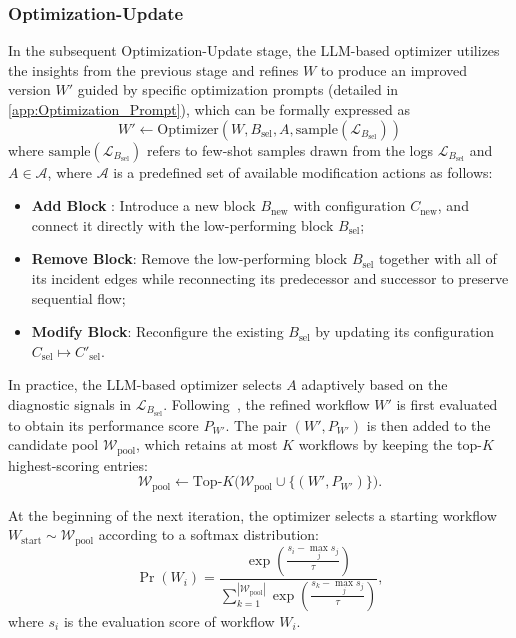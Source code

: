 \documentclass{article}
\theoremstyle{plain}
\theoremstyle{definition}
\theoremstyle{remark}
\begin{document}
\subsubsection{Optimization-Update}
In the subsequent Optimization-Update stage, the LLM-based optimizer utilizes the insights from the previous stage and refines $W$ to produce an improved version $W'$ guided by specific optimization prompts (detailed in \cref{app:Optimization_Prompt}), which can be formally expressed as
\begin{equation} \label{eq:optimization_step}
W' \leftarrow \text{Optimizer}(W, B_{\text{sel}}, A, \text{sample}(\mathcal{L}_{B_{\text{sel}}}))
\end{equation}
where $\text{sample}(\mathcal{L}_{B_{\text{sel}}})$ refers to few-shot samples drawn from the logs $\mathcal{L}_{B_{\text{sel}}}$ and $A\in \mathcal{A}$, where $\mathcal{A}$ is a predefined set of available modification actions as follows:
\begin{itemize}
    \item \textbf{Add Block} : Introduce a new block $B_{\text{new}}$ with configuration $C_{\text{new}}$, and connect it directly with the low-performing block $B_{\text{sel}}$;
    \item \textbf{Remove Block}: Remove the low-performing block $B_{\text{sel}}$ together with all of its incident edges while reconnecting its predecessor and successor to preserve sequential flow;
    \item \textbf{Modify Block}: Reconfigure the existing $B_{\text{sel}}$ by updating its configuration $C_{\text{sel}} \mapsto C'_{\text{sel}}$.
\end{itemize}
In practice, the LLM-based optimizer selects $A$ adaptively based on the diagnostic signals in $\mathcal{L}_{B_{\text{sel}}}$.
Following~\citet{zhang_aflow_2025}, the refined workflow $W'$ is first evaluated to obtain its performance score $P_{W'}$. 
The pair $(W', P_{W'})$ is then added to the candidate pool $\mathcal{W}_{\text{pool}}$, which retains at most $K$ workflows by keeping the top-$K$ highest-scoring entries:
\begin{equation}
\mathcal{W}_{\text{pool}} \leftarrow \text{Top-}K\big(\mathcal{W}_{\text{pool}} \cup \{(W', P_{W'})\}\big).
\end{equation}

At the beginning of the next iteration, the optimizer selects a starting workflow $W_{\text{start}} \sim \mathcal{W}_{\text{pool}}$ according to a softmax distribution:
\begin{equation}
\Pr(W_i) = \frac{\exp\!\left(\tfrac{s_i - \max_j s_j}{\tau}\right)}{\sum_{k=1}^{|\mathcal{W}_{\text{pool}}|} \exp\!\left(\tfrac{s_k - \max_j s_j}{\tau}\right)},
\end{equation}
where $s_i$ is the evaluation score of workflow $W_i$. 
\end{document}
